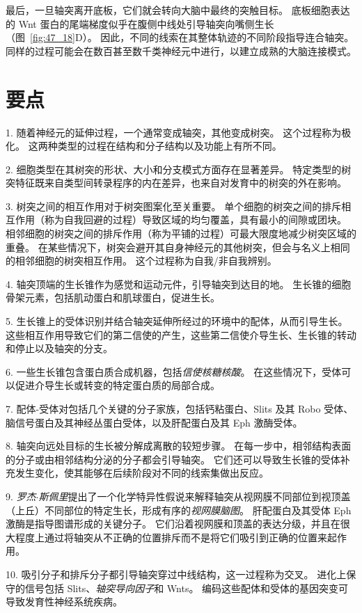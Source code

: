 最后，一旦轴突离开底板，它们就会转向大脑中最终的突触目标。
底板细胞表达的 Wnt 蛋白的尾端梯度似乎在腹侧中线处引导轴突向嘴侧生长（图~\ref{fig:47_18}D）。
因此，不同的线索在其整体轨迹的不同阶段指导连合轴突。
同样的过程可能会在数百甚至数千类神经元中进行，以建立成熟的大脑连接模式。



\section{要点}

1. 随着神经元的延伸过程，一个通常变成轴突，其他变成树突。
这个过程称为极化。
这两种类型的过程在结构和分子结构以及功能上有所不同。 


2. 细胞类型在其树突的形状、大小和分支模式方面存在显著差异。
特定类型的树突特征既来自类型间转录程序的内在差异，也来自对发育中的树突的外在影响。


3. 树突之间的相互作用对于树突图案化至关重要。
单个细胞的树突之间的排斥相互作用（称为自我回避的过程）导致区域的均匀覆盖，具有最小的间隙或团块。
相邻细胞的树突之间的排斥作用（称为平铺的过程）可最大限度地减少树突区域的重叠。
在某些情况下，树突会避开其自身神经元的其他树突，但会与名义上相同的相邻细胞的树突相互作用。
这个过程称为自我/非自我辨别。


4. 轴突顶端的生长锥作为感觉和运动元件，引导轴突到达目的地。
生长锥的细胞骨架元素，包括肌动蛋白和肌球蛋白，促进生长。


5. 生长锥上的受体识别并结合轴突延伸所经过的环境中的配体，从而引导生长。
这些相互作用导致它们的第二信使的产生，这些第二信使介导生长、生长锥的转动和停止以及轴突的分支。


6. 一些生长锥包含蛋白质合成机器，包括\textit{信使核糖核酸}。
在这些情况下，受体可以促进介导生长或转变的特定蛋白质的局部合成。


7. 配体-受体对包括几个关键的分子家族，包括钙粘蛋白、Slits 及其 Robo 受体、脑信号蛋白及其神经丛蛋白受体，以及肝配蛋白及其 Eph 激酶受体。


8. 轴突向远处目标的生长被分解成离散的较短步骤。 在每一步中，相邻结构表面的分子或由相邻结构分泌的分子都会引导轴突。
它们还可以导致生长锥的受体补充发生变化，使其能够在后续阶段对不同的线索集做出反应。


9. \textit{罗杰$\cdot$斯佩里}提出了一个化学特异性假说来解释轴突从视网膜不同部位到视顶盖（上丘）不同部位的特定生长，形成有序的\textit{视网膜脑图}。
肝配蛋白及其受体 Eph 激酶是指导图谱形成的关键分子。
它们沿着视网膜和顶盖的表达分级，并且在很大程度上通过将轴突从不正确的位置排斥而不是将它们吸引到正确的位置来起作用。


10. 吸引分子和排斥分子都引导轴突穿过中线结构，这一过程称为交叉。
进化上保守的信号包括 Slits、\textit{轴突导向因子}和 Wnts。
编码这些配体和受体的基因突变可导致发育性神经系统疾病。

